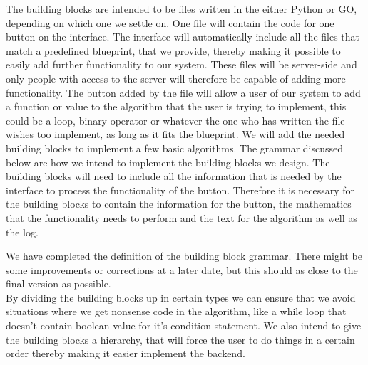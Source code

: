 \documentclass[11pt]{article}
\begin{document}
The building blocks are intended to be files written in the either Python or GO, depending on which one we settle on. One file will contain the code for one button on the interface. The interface will automatically include all the files that match a predefined blueprint, that we provide, thereby making it possible to easily add further functionality to our system. These files will be server-side and only people with access to the server will therefore be capable of adding more functionality. The button added by the file will allow a user of our system to add a function or value to the algorithm that the user is trying to implement, this could be a loop, binary operator or whatever the one who has written the file wishes too implement, as long as it fits the blueprint. We will add the needed building blocks to implement a few basic algorithms. The grammar discussed below are how we intend to implement the building blocks we design. The building blocks will need to include all the information that is needed by the interface to process the functionality of the button. Therefore it is necessary for the building blocks to contain the information for the button, the mathematics that the functionality needs to perform and the text for the algorithm as well as the log.

We have completed the definition of the building block grammar. There might be some improvements or corrections at a later date, but this should as close to the final version as possible.\\
By dividing the building blocks up in certain types we can ensure that we avoid situations where we get nonsense code in the algorithm, like a while loop that doesn't contain boolean value for it's condition statement. We also intend to give the building blocks a hierarchy, that will force the user to do things in a certain order thereby making it easier implement the backend. 
\end{document}
